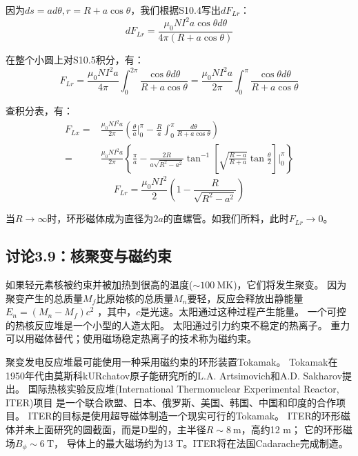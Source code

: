 因为$d s=a d\theta,r=R + a \cos\theta$，我们根据S10.4写出$dF_{Lr}$：
\begin{equation*}
dF_{Lr}=\frac{\mu_{0}NI^{2}a\cos\theta d\theta}{4\pi(R+a\cos\theta)}\tag{S10.5}%
\end{equation*}

在整个小圆上对S10.5积分，有：
\begin{equation*}
F_{Lr}=\frac{\mu_{0}NI^{2}a}{4\pi}\int_{0}^{2\pi}\frac{\cos\theta d\theta}{R+a\cos\theta}=\frac{\mu_{0}NI^{2}a}{2\pi}\int_{0}^{\pi}\frac{\cos\theta d\theta}{R+a\cos\theta}\tag{S10.6}%
\end{equation*}

查积分表，有：
\begin{equation*}
\begin{split}
F_{Lx}=&\frac{\mu_{0}NI^{2}a}{2\pi}(\frac{\theta}{a}\big|_{0}^{\pi}-\frac{R}{a}\int_{0}^{\pi}\frac{d\theta}{R+a\cos\theta})\\
=&\frac{\mu_{0}NI^{2}a}{2\pi}\left\{\frac{\pi}{a}-\frac{2R}{a\sqrt{R^{2}-a^{2}}}\tan^{-1}\left[\sqrt{\frac{R-a}{R+a}}\tan\frac{\theta}{2}\right]\big|_{0}^{\pi}\right\}%
\end{split}\tag{S10.7a}
\end{equation*}
\begin{equation*}
F_{Lr}=\frac{\mu_{0}NI^{2}}{2}(1-\frac{R}{\sqrt{R^{2}-a^{2}}})\tag{3.162}%
\end{equation*}

当$R\rightarrow \infty$时，环形磁体成为直径为$2a$的直螺管。如我们所料，此时$F_{Lr}\rightarrow 0$。



\subsection{讨论3.9：核聚变与磁约束}
如果轻元素核被约束并被加热到很高的温度($\sim 100\ \mathrm{MK}$)，它们将发生聚变。
因为聚变产生的总质量$M_f$比原始核的总质量$M_n$要轻，反应会释放出静能量$E_n =(M_n−M_f)c^2$
，其中，$c$是光速。太阳通过这种过程产生能量。
一个可控的热核反应堆是一个小型的人造太阳。
太阳通过引力约束不稳定的热离子。
重力可以用磁体替代；使用磁场稳定热离子的技术称为磁约束。

聚变发电反应堆最可能使用一种采用磁约束的环形装置Tokamak。
Tokamak在1950年代由莫斯科kURchatov原子能研究所的L.A. Artsimovich和A.D. Sakharov提出。
国际热核实验反应堆(International Thermonuclear Experimental Reactor, ITER)项目
是一个联合欧盟、日本、俄罗斯、美国、韩国、中国和印度的合作项目。
ITER的目标是使用超导磁体制造一个现实可行的Tokamak。
ITER的环形磁体并未上面研究的圆截面，而是D型的，主半径$R\sim 8\ \mathrm{m}$，高约12 m；
它的环形磁场$B_\phi\sim 6\ \mathrm{T}$，
导体上的最大磁场约为13 T。ITER将在法国Cadarache完成制造。



